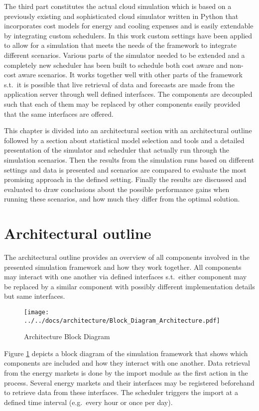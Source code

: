 The third part constitutes the actual cloud simulation which is based on a previously existing and sophisticated cloud simulator written in Python that incorporates cost models for energy and cooling expenses and is easily extendable by integrating custom schedulers. In this work custom settings have been applied to allow for a simulation that meets the needs of the framework to integrate different scenarios. Various parts of the simulator needed to be extended and a completely new scheduler has been built to schedule both cost aware and non-cost aware scenarios. It works together well with other parts of the framework s.t.~it is possible that live retrieval of data and forecasts are made from the application server through well defined interfaces. The components are decoupled such that each of them may be replaced by other components easily provided that the same interfaces are offered. 

This chapter is divided into an architectural section with an architectural outline followed by a section about statistical model selection and tools and a detailed presentation of the simulator and scheduler that actually run through the simulation scenarios. Then the results from the simulation runs based on different settings and data is presented and scenarios are compared to evaluate the most promising approach in the defined setting. Finally the results are discussed and evaluated to draw conclusions about the possible performance gains when running these scenarios, and how much they differ from the optimal solution. 


\section{Architectural outline}

The architectural outline provides an overview of all components involved in the presented simulation framework and how they work together. All components may interact with one another via defined interfaces s.t.~either component may be replaced by a similar component with possibly different implementation details but same interfaces. 

\begin{figure}[htbp]
	\centering
		\texttt{[image: ../../docs/architecture/Block\_Diagram\_Architecture.pdf]}
	\caption{Architecture Block Diagram}
	\label{fig:Block_Diagram_Architecture}
\end{figure}

Figure \ref{fig:Block_Diagram_Architecture} depicts a block diagram of the simulation framework that shows which components are included and how they interact with one another. Data retrieval from the energy markets is done by the import module as the first action in the process. Several energy markets and their interfaces may be registered beforehand to retrieve data from these interfaces. The scheduler triggers the import at a defined time interval (e.g.~every hour or once per day). 

